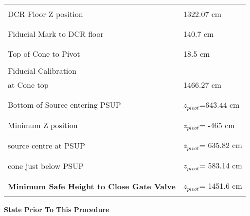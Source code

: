 \newpage
~
\vspace*{0.5in}
\begin{center}
\begin{tabular}{|l|l|}
\hline
 & \\
DCR Floor Z position     & 1322.07 cm\\
 & \\
\hline
 & \\
Fiducial Mark to DCR floor & 140.7 cm \\
 & \\
\hline
& \\
Top of Cone to Pivot & 18.5 cm\\
& \\
\hline
Fiducial Calibration & \\
at Cone top          & 1466.27 cm\\
 & \\
\hline
 & \\
Bottom of Source entering PSUP & $z_{pivot}$=643.44 cm \\
 & \\
\hline
 & \\
Minimum Z position &  $z_{pivot}$= -465 cm \\
 & \\
\hline
 & \\
source centre at PSUP &  $z_{pivot}$= 635.82 cm \\
 & \\
\hline
 & \\
cone just below PSUP &  $z_{pivot}$= 583.14 cm \\
 & \\
\hline
 & \\
{\bf Minimum Safe Height to Close Gate Valve} &  $z_{pivot}$= 1451.6 cm \\
 & \\
\hline
\end{tabular}
\end{center}
  
\newpage
\noindent
{\bf State Prior To This Procedure}
 
